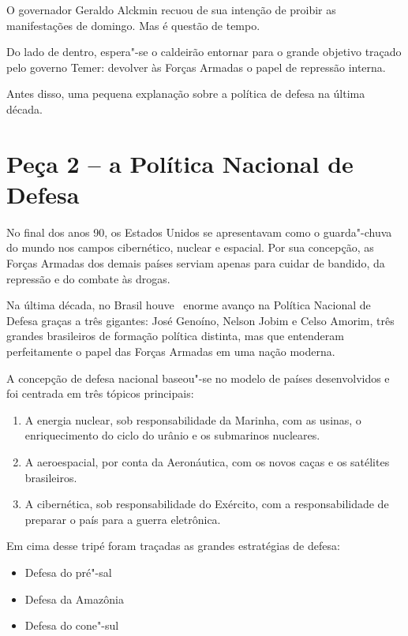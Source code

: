 O governador Geraldo Alckmin recuou de sua intenção de proibir as
manifestações de domingo. Mas é questão de tempo.

Do lado de dentro, espera"-se o caldeirão entornar para o grande objetivo
traçado pelo governo Temer: devolver às Forças Armadas o papel de
repressão interna.

Antes disso, uma pequena explanação sobre a política de defesa na última
década.

\section{Peça 2 -- a Política Nacional de Defesa}

No final dos anos 90, os Estados Unidos se apresentavam como o
guarda"-chuva do mundo nos campos cibernético, nuclear e espacial. Por
sua concepção, as Forças Armadas dos demais países serviam apenas para
cuidar de bandido, da repressão e do combate às drogas.

Na última década, no Brasil houve~ enorme avanço na Política Nacional de
Defesa graças a três gigantes: José Genoíno, Nelson Jobim e Celso
Amorim, três grandes brasileiros de formação política distinta, mas que
entenderam perfeitamente o papel das Forças Armadas em uma nação
moderna.

A concepção de defesa nacional baseou"-se no modelo de países
desenvolvidos e foi centrada em três tópicos principais:

\begin{enumerate}
\itemsep1pt\parskip0pt
\item
  A energia nuclear, sob responsabilidade da Marinha, com as usinas, o
  enriquecimento do ciclo do urânio e os submarinos nucleares.
\item
  A aeroespacial, por conta da Aeronáutica, com os novos caças e os
  satélites brasileiros.
\item
  A cibernética, sob responsabilidade do Exército, com a
  responsabilidade de preparar o país para a guerra eletrônica.
\end{enumerate}

Em cima desse tripé foram traçadas as grandes estratégias de defesa:

\begin{itemize}
\itemsep1pt\parskip0pt
\item
  Defesa do pré"-sal
\item
  Defesa da Amazônia
\item
  Defesa do cone"-sul
\end{itemize}

